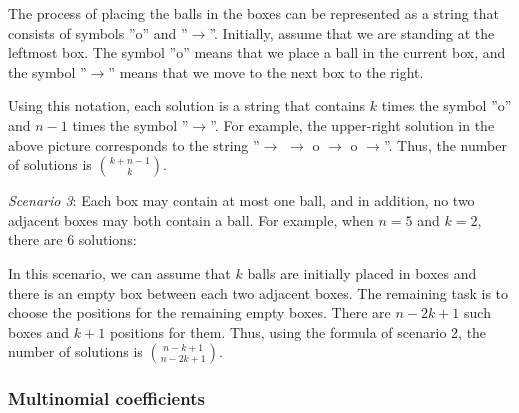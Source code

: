 The process of placing the balls in the boxes
can be represented as a string
that consists of symbols
''o'' and ''$\rightarrow$''.
Initially, assume that we are standing at the leftmost box.
The symbol ''o'' means that we place a ball
in the current box, and the symbol
''$\rightarrow$'' means that we move to
the next box to the right.

Using this notation, each solution is a string
that contains $k$ times the symbol ''o'' and
$n-1$ times the symbol ''$\rightarrow$''.
For example, the upper-right solution
in the above picture corresponds to the string
''$\rightarrow$ $\rightarrow$ o $\rightarrow$ o $\rightarrow$''.
Thus, the number of solutions is
${k+n-1 \choose k}$.

\textit{Scenario 3}: Each box may contain at most one ball,
and in addition, no two adjacent boxes may both contain a ball.
For example, when $n=5$ and $k=2$,
there are 6 solutions:


\begin{center}
\end{center}

In this scenario, we can assume that
$k$ balls are initially placed in boxes
and there is an empty box between each
two adjacent boxes.
The remaining task is to choose the
positions for the remaining empty boxes.
There are $n-2k+1$ such boxes and
$k+1$ positions for them.
Thus, using the formula of scenario 2,
the number of solutions is
${n-k+1 \choose n-2k+1}$.

\subsubsection{Multinomial coefficients}

